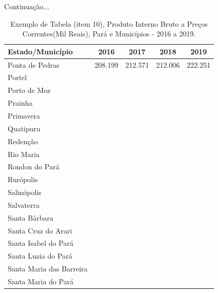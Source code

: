 \newpage
\begin{table}[!htb]
    \centering
    {
    \caption{Exemplo de Tabela (item 10), Produto Interno Bruto a Preços Correntes(Mil Reais), Pará e Municípios - 2016 a 2019.}  Continuação...
    \label{item 10 regras4}
    \vspace{0.1cm}
\begin{tabular}{l|c|c|c|c}
  \hline\hline
  Estado/Município          &    2016   &    2017 &  2018   &  2019   \\
  \hline\hline
   Ponta de Pedras          &  208.199  & 212.571 & 212.006 & 222.251 \\
   Portel                   &      &      &      &     \\
   Porto de Moz             &      &      &      &  \\
   Prainha                  &             &             &             &              \\ 
   Primavera                &             &             &             &              \\
   Quatipuru                &             &             &             &              \\
   Redenção                 &             &             &             &              \\
   Rio Maria                &             &             &             &              \\
   Rondon do Pará           &             &             &             &              \\
   Rurópolis                &             &             &             &               \\
   Salinópolis              &             &             &             &               \\
   Salvaterra               &             &             &             &               \\
   Santa Bárbara            &             &             &             &    \\
   Santa Cruz do Arari      &             &             &             &    \\
   Santa Isabel do Pará     &             &             &             &    \\
   Santa Luzia do Pará      &             &             &             &   \\
   Santa Maria das Barreira &             &             &             &    \\
   Santa Maria do Pará      &             &             &             &    \\

\end{tabular}}
\end{table}
